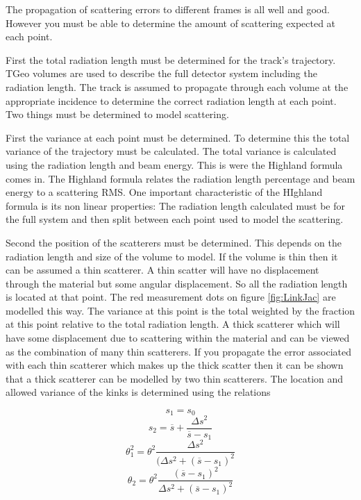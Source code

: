 The propagation of scattering errors to different frames is all well and good. However you must be able to determine the amount of scattering expected at each point.

First the total radiation length must be determined for the track's trajectory. TGeo volumes are used to describe the full detector system including the radiation length. The track is assumed to propagate through each volume at the appropriate incidence to determine the correct radiation length at each point. Two things must be determined to model scattering.

First the variance at each point must be determined. To determine this the total variance of the trajectory must be calculated. The total variance is calculated using the radiation length and beam energy. This is were the Highland formula comes in. The Highland formula relates the radiation length percentage and beam energy to a scattering RMS. One important characteristic of the HIghland formula is its non linear properties: The radiation length calculated must be for the full system and then split between each point used to model the scattering. 

Second the position of the scatterers must be determined. This depends on the radiation length and size of the volume to model. If the volume is thin then it can be assumed a thin scatterer. A thin scatter will have no displacement through the material but some angular displacement. So all the radiation length is located at that point. The red measurement dots on figure \ref{fig:LinkJac} are modelled this way. The variance at this point is the total weighted by the fraction at this point relative to the total radiation length.
A thick scatterer which will have some displacement due to scattering within the material and can be viewed as the combination of many thin scatterers. If you propagate the error associated with each thin scatterer which makes up the thick scatter then it can be shown that a thick scatterer can be modelled by two thin scatterers. The location and allowed variance of the kinks is determined using the relations

\begin{multicols}{2}
\begin{equation}
 s_1 = s_0
\end{equation}
\begin{equation}
s_2 = \overline{s} + \frac{\Delta s^{2}}{\overline s - s_1} 
\end{equation}
\begin{equation}
\theta_{1}^{2} = \theta^{2}\frac{\Delta s^{2}}{(\Delta s^2 + (\overline s - s_1)^{2}} 
\end{equation}
\begin{equation}
\theta_{2} = \theta^{2}\frac{(\overline s - s_1)^{2}}{\Delta s^2 + (\overline s - s_1)^2} 
\end{equation}
\end{multicols}

